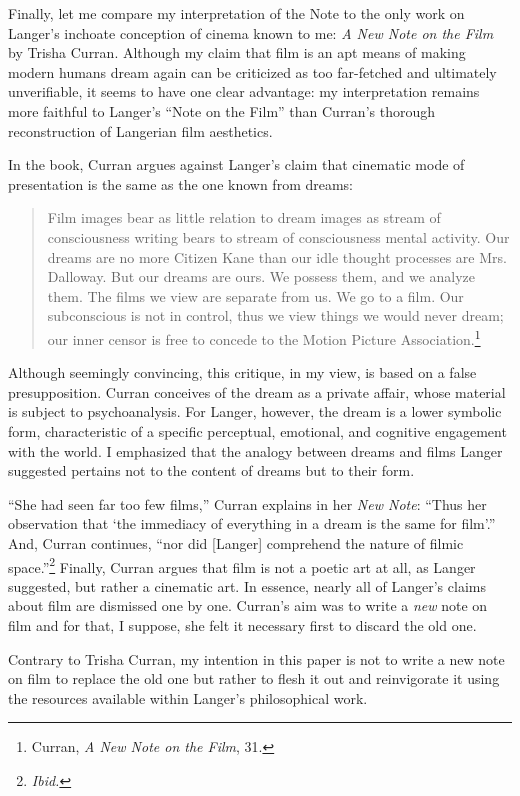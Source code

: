 \documentclass{tufte-handout}
\begin{document}
Finally, let me compare my interpretation of the Note to the only work
on Langer's inchoate conception of cinema known to me: \emph{A New Note
on the Film} by Trisha Curran. Although my claim that film is an apt
means of making modern humans dream again can be criticized as too
far-fetched and ultimately unverifiable, it seems to have one clear
advantage: my interpretation remains more faithful to Langer's ``Note on
the Film'' than Curran's thorough reconstruction of Langerian film
aesthetics.

In the book, Curran argues against Langer's claim that cinematic mode of
presentation is the same as the one known from dreams:

\begin{quote}
Film images bear as little relation to dream images as stream of
consciousness writing bears to stream of consciousness mental activity.
Our dreams are no more Citizen Kane than our idle thought processes are
Mrs. Dalloway. But our dreams are ours. We possess them, and we analyze
them. The films we view are separate from us. We go to a film. Our
subconscious is not in control, thus we view things we would never
dream; our inner censor is free to concede to the Motion Picture
Association.\footnote{Curran, \emph{A New Note on the Film}, 31.}
\end{quote}

\noindent Although seemingly convincing, this critique, in my view, is based on a
false presupposition. Curran conceives of the dream as a private affair,
whose material is subject to psychoanalysis. For Langer, however, the
dream is a lower symbolic form, characteristic of a specific perceptual,
emotional, and cognitive engagement with the world. I emphasized that
the analogy between dreams and films Langer suggested pertains not to
the content of dreams but to their form.

``She had seen far too few films,'' Curran explains in her \emph{New
Note}: ``Thus her observation that `the immediacy of everything in a
dream is the same for film'.'' And, Curran continues, ``nor did
{[}Langer{]} comprehend the nature of filmic space.''\footnote{\emph{Ibid.}}
Finally, Curran argues that film is not a poetic art at all, as Langer
suggested, but rather a cinematic art. In essence, nearly all of
Langer's claims about film are dismissed one by one. Curran's aim was to
write a \emph{new} note on film and for that, I suppose, she felt it
necessary first to discard the old one.

Contrary to Trisha Curran, my intention in this paper is not to write a
new note on film to replace the old one but rather to flesh it out and
reinvigorate it using the resources available within Langer's
philosophical work.
\end{document}
